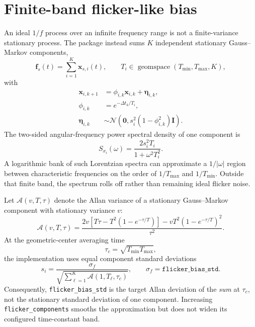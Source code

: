 \documentclass[11pt,oneside,headings=big]{scrreprt}
\newcommand{\Normal}{\mathcal{N}}
\newcommand{\vect}[1]{\bm{#1}}
\newcommand{\mat}[1]{\bm{#1}}
\newcommand{\field}[1]{\texttt{#1}}
\begin{document}
    \section{Finite-band flicker-like bias}
    An ideal \(1/f\) process over an infinite frequency range is not a finite-variance
    stationary process. The package instead sums \(K\) independent stationary
    Gauss--Markov components,
    \begin{equation}
        \vect f_s(t)=\sum_{i=1}^{K}\vect x_{s,i}(t),
        \qquad
        T_i\in\operatorname{geomspace}(T_{\min},T_{\max},K),
        \label{eq:flicker-sum}
    \end{equation}
    with
    \begin{align}
        \vect x_{i,k+1}&=\phi_{i,k}\vect x_{i,k}+\vect\eta_{i,k},\\
        \phi_{i,k}&=e^{-\Delta t_k/T_i},\\
        \vect\eta_{i,k}&\sim\Normal\!\left(
                                         \vect0,s_i^2(1-\phi_{i,k}^2)\mat I\right).
        \label{eq:flicker-components}
    \end{align}
    The two-sided angular-frequency power spectral density of one component is
    \begin{equation}
        S_{x_i}(\omega)=\frac{2s_i^2T_i}{1+\omega^2T_i^2}.
        \label{eq:ou-psd}
    \end{equation}
    A logarithmic bank of such Lorentzian spectra can approximate a
    \(1/\lvert\omega\rvert\) region between characteristic frequencies on the order
    of \(1/T_{\max}\) and \(1/T_{\min}\). Outside that finite band, the spectrum
    rolls off rather than remaining ideal flicker noise.

    Let \(\mathcal A(v,T,\tau)\) denote the Allan variance of a stationary
    Gauss--Markov component with stationary variance \(v\):
    \begin{equation}
        \mathcal A(v,T,\tau)=
        \frac{
            2v\left[T\tau-T^2(1-e^{-\tau/T})\right]
            -vT^2(1-e^{-\tau/T})^2
        }{\tau^2}.
        \label{eq:gm-allan-function}
    \end{equation}
    At the geometric-center averaging time
    \begin{equation}
        \tau_c=\sqrt{T_{\min}T_{\max}},
    \end{equation}
    the implementation uses equal component standard deviations
    \begin{equation}
        s_i=\frac{\sigma_f}{
            \sqrt{\displaystyle\sum_{\ell=1}^{K}
                \mathcal A(1,T_\ell,\tau_c)}},
        \qquad
        \sigma_f=\field{flicker\_bias\_std}.
        \label{eq:flicker-normalization}
    \end{equation}
    Consequently, \field{flicker\_bias\_std} is the target Allan deviation of the
    \emph{sum} at \(\tau_c\), not the stationary standard deviation of one component.
    Increasing \field{flicker\_components} smooths the approximation but does not
    widen its configured time-constant band.
\end{document}
